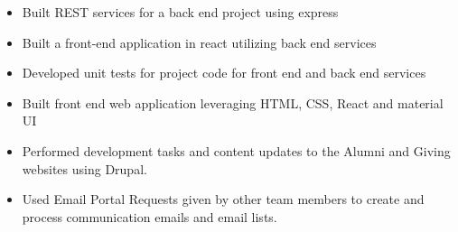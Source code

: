 \documentclass[10pt,a4paper,ragged2e,withhyper]{altacv}
\begin{document}
    
    \begin{paracol}{2}
    
        \newline
        
    
    
\begin{itemize}
\item Built REST services for a back end project using express
\item Built a front-end application in react utilizing back end services
\item Developed unit tests for project code for front end and back end services
\item Built front end web application leveraging HTML, CSS, React and material UI
\end{itemize}
    \smallskip \smallskip
    \newline
        
    \newline
    \divider
    

\begin{itemize}
\item Performed development tasks and content updates to the Alumni and Giving websites using Drupal. 
\item Used Email Portal Requests given by other team members to create and process communication emails and email lists. 
    \end{itemize}
    
\smallskip \smallskip
    \newline
       			 
    \newline
    



    
    
    \switchcolumn
    

\end{paracol}
\end{document}
